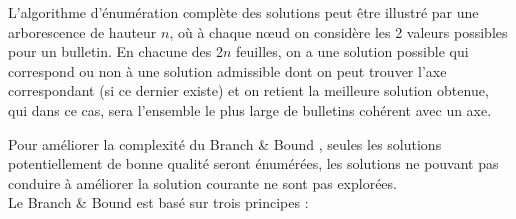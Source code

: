 \documentclass[12pt]{article}
\begin{document}
L'algorithme d'\'{e}num\'{e}ration compl\`{e}te des solutions peut \^{e}tre illustr\'{e} par une arborescence de hauteur $n$, o\`{u} \`{a} chaque n\oe{}ud on consid\`{e}re les 2 valeurs possibles pour un bulletin. En chacune des 2$n$ feuilles, on a une solution possible qui correspond ou non \`{a} une solution admissible dont on peut trouver l'axe correspondant (si ce dernier existe) et on retient la meilleure solution obtenue, qui dans ce cas, sera l'ensemble le plus large de bulletins coh\'{e}rent avec un axe.

Pour am\'{e}liorer la complexit\'{e} du \og Branch \& Bound \fg, seules les solutions potentiellement de bonne qualit\'{e} seront \'{e}num\'{e}r\'{e}es, les solutions ne pouvant pas conduire \`{a} am\'{e}liorer la solution courante ne sont pas explor\'{e}es. \\

Le \og Branch \& Bound \fg{} est bas\'{e} sur trois principes : \\
\end{document}
